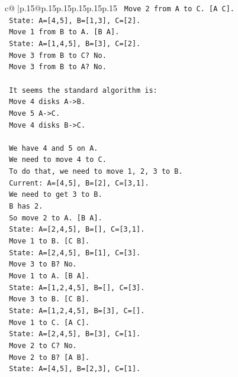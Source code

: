 \documentclass{article}
\begin{document}
{\begin{supertabular}{c@{$\;$}|p{.15\linewidth}@{}p{.15\linewidth}p{.15\linewidth}p{.15\linewidth}p{.15\linewidth}p{.15\linewidth}}
{{{\texttt{   Move 2 from A to C. {[}A C{]}.} \\
\texttt{   State: A={[}4,5{]}, B={[}1,3{]}, C={[}2{]}.} \\
\texttt{   Move 1 from B to A. {[}B A{]}.} \\
\texttt{   State: A={[}1,4,5{]}, B={[}3{]}, C={[}2{]}.} \\
\texttt{   Move 3 from B to C? No.} \\
\texttt{   Move 3 from B to A? No.} \\
\\ 
\texttt{   It seems the standard algorithm is:} \\
\texttt{   Move 4 disks A{-}>B.} \\
\texttt{   Move 5 A{-}>C.} \\
\texttt{   Move 4 disks B{-}>C.} \\
\\ 
\texttt{   We have 4 and 5 on A.} \\
\texttt{   We need to move 4 to C.} \\
\texttt{   To do that, we need to move 1, 2, 3 to B.} \\
\texttt{   Current: A={[}4,5{]}, B={[}2{]}, C={[}3,1{]}.} \\
\texttt{   We need to get 3 to B.} \\
\texttt{   B has 2.} \\
\texttt{   So move 2 to A. {[}B A{]}.} \\
\texttt{   State: A={[}2,4,5{]}, B={[}{]}, C={[}3,1{]}.} \\
\texttt{   Move 1 to B. {[}C B{]}.} \\
\texttt{   State: A={[}2,4,5{]}, B={[}1{]}, C={[}3{]}.} \\
\texttt{   Move 3 to B? No.} \\
\texttt{   Move 1 to A. {[}B A{]}.} \\
\texttt{   State: A={[}1,2,4,5{]}, B={[}{]}, C={[}3{]}.} \\
\texttt{   Move 3 to B. {[}C B{]}.} \\
\texttt{   State: A={[}1,2,4,5{]}, B={[}3{]}, C={[}{]}.} \\
\texttt{   Move 1 to C. {[}A C{]}.} \\
\texttt{   State: A={[}2,4,5{]}, B={[}3{]}, C={[}1{]}.} \\
\texttt{   Move 2 to C? No.} \\
\texttt{   Move 2 to B? {[}A B{]}.} \\
\texttt{   State: A={[}4,5{]}, B={[}2,3{]}, C={[}1{]}.} \\
}}}
\end{supertabular}}
\end{document}
